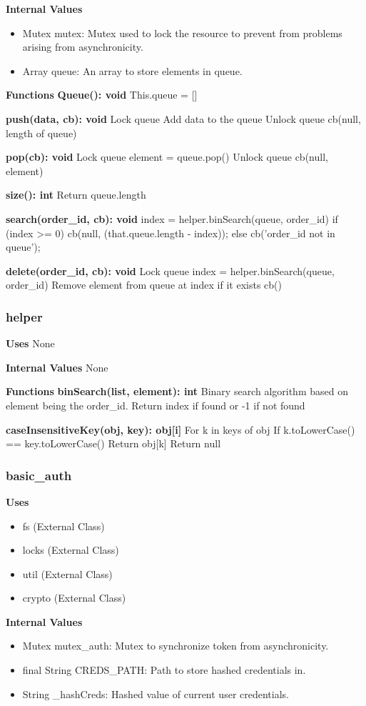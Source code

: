 \documentclass [10pt]{article}
\begin{document}
\textbf{Internal Values}
\begin{itemize}
	\item Mutex mutex: Mutex used to lock the resource to prevent from problems arising from asynchronicity.
	\item Array queue: An array to store elements in queue.
\end{itemize}

\textbf{Functions}
\textbf{Queue(): void}
This.queue = []

\textbf{push(data, cb): void}
Lock queue
Add data to the queue
Unlock queue
cb(null, length of queue)

\textbf{pop(cb): void}
Lock queue
element = queue.pop()
Unlock queue
cb(null, element)

\textbf{size(): int}
Return queue.length

\textbf{search(order\_id, cb): void}
index = helper.binSearch(queue, order\_id)
if (index >= 0) {
	cb(null, (that.queue.length - index));
} else {
cb('order\_id not in queue');
}

\textbf{delete(order\_id, cb): void}
Lock queue
index = helper.binSearch(queue, order\_id)
Remove element from queue at index if it exists
cb()

\subsubsection{helper}
\textbf{Uses}
None

\textbf{Internal Values}
None

\textbf{Functions}
\textbf{binSearch(list, element): int}
Binary search algorithm based on element being the order\_id.
Return index if found or -1 if not found

\textbf{caseInsensitiveKey(obj, key): obj[i]}
For k in keys of obj
	If k.toLowerCase() == key.toLowerCase()
		Return obj[k]
Return null

\subsubsection{basic\_auth}
\textbf{Uses}
\begin{itemize}
	\item fs (External Class)
	\item locks (External Class)
	\item util (External Class)
	\item crypto (External Class)
\end{itemize}

\textbf{Internal Values}
\begin{itemize}
	\item Mutex mutex\_auth: Mutex to synchronize token from asynchronicity.
	\item final String CREDS\_PATH: Path to store hashed credentials in.
	\item String \_hashCreds: Hashed value of current user credentials.
\end{itemize}
\end{document}
